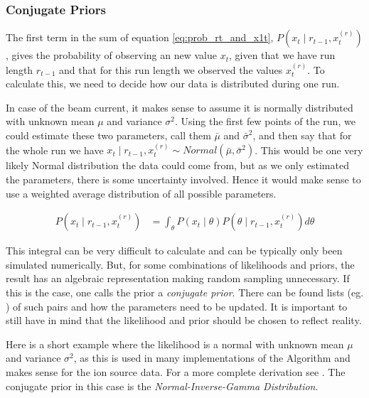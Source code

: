 \documentclass[12pt,a4paper]{article}
\begin{document}
\subsubsection{Conjugate Priors}\label{sec:conjugate_priors}
The first term in the sum of equation \eqref{eq:prob_rt_and_x1t}, $P(x_t \mid r_{t-1}, x_t^{(r)})$, gives the probability of observing an new value $x_t$, given that we have run length $r_{t-1}$ and that for this run length we observed the values $x_t^{(r)}$. To calculate this, we need to decide how our data is distributed during one run. 

In case of the beam current, it makes sense to assume it is normally distributed with unknown mean $\mu$ and variance $\sigma^2$. Using the first few points of the run, we could estimate these two parameters, call them $\bar\mu$ and $\bar\sigma^2$, and then say that for the whole run we have $x_t \mid r_{t-1}, x_t^{(r)} \sim Normal(\bar\mu, \bar\sigma^2)$. This would be one very likely Normal distribution the data could come from, but as we only estimated the parameters, there is some uncertainty involved. Hence it would make sense to use a weighted average distribution of all possible parameters.

\begin{equation}\label{eq:pred_posterior}
\begin{aligned}
	P(x_t \mid r_{t-1}, x_t^{(r)}) &= \int_\theta P(x_t \mid \theta) P(\theta \mid r_{t-1}, x_t^{(r)}) d\theta
\end{aligned}
\end{equation}

This integral can be very difficult to calculate and can be typically only been simulated numerically. But, for some combinations of likelihoods and priors, the result has an algebraic representation making random sampling unnecessary. If this is the case, one calls the prior a \textit{conjugate prior}. There can be found lists (eg. \cite{Fink:CompendiumConjugatePriors}) of such pairs and how the parameters need to be updated. It is important to still have in mind that the likelihood and prior should be chosen to reflect reality.

Here is a short example where the likelihood is a normal with unknown mean $\mu$ and variance $\sigma^2$, as this is used in many implementations of the Algorithm and makes sense for the ion source data. For a more complete derivation see \cite{Murphy:ConjugateBayesiananalysis}. The conjugate prior in this case is the \textit{Normal-Inverse-Gamma Distribution}.
\end{document}
